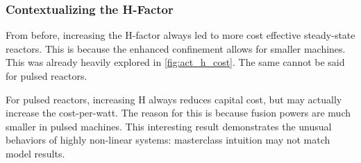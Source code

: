 \subsubsection{Contextualizing the H-Factor}

From before, increasing the H-factor always led to more cost effective steady-state reactors. This is because the enhanced confinement allows for smaller machines. This was already heavily explored in \cref{fig:act_h_cost}. The same cannot be said for pulsed reactors.

For pulsed reactors, increasing H always reduces capital cost, but may actually increase the cost-per-watt. The reason for this is because fusion powers are much smaller in pulsed machines. This interesting result demonstrates the unusual behaviors of highly non-linear systems: masterclass intuition may not match model results.

